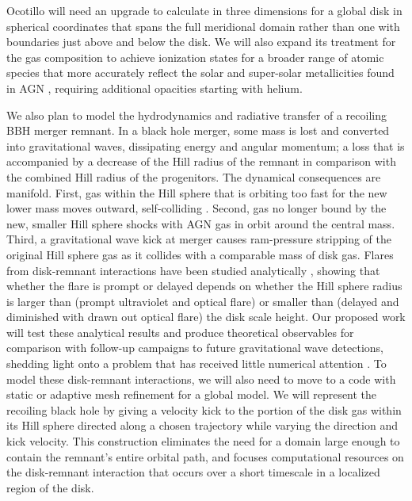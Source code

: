 Ocotillo will need an upgrade to calculate in three dimensions for a global disk in spherical coordinates that spans the full meridional domain rather than one with boundaries just above and below the disk.
We will also expand its treatment for the gas composition to achieve ionization states for a broader range of atomic species that more accurately reflect the solar and super-solar metallicities found in AGN \citep{HuangLinShields23}, requiring additional opacities starting with helium.


We also plan to model the hydrodynamics and radiative transfer of a recoiling BBH merger remnant.
In a black hole merger, some mass is lost and converted into gravitational waves, dissipating energy and angular momentum; a loss that is accompanied by a decrease of the Hill radius of the remnant in comparison with the combined Hill radius of the progenitors.
The dynamical consequences are manifold.
First, gas within the Hill sphere that is orbiting too fast for the new lower mass moves outward, self-colliding \citep{McKernan+19}.
Second, gas no longer bound by the new, smaller Hill sphere shocks with AGN gas in orbit around the central mass.
Third, a gravitational wave kick at merger causes ram-pressure stripping of the original Hill sphere gas as it collides with a comparable mass of disk gas.
Flares from disk-remnant interactions have been studied analytically \citep{McKernan+19}, showing that whether the flare is prompt or delayed depends on whether the Hill sphere radius is larger than (prompt ultraviolet and optical flare) or smaller than (delayed and diminished with drawn out optical flare) the disk scale height.
Our proposed work will test these analytical results and produce theoretical observables for comparison with follow-up campaigns to future gravitational wave detections, shedding light onto a problem that has received little numerical attention \citep{Corrales+10}.
To model these disk-remnant interactions, we will also need to move to a code with static or adaptive mesh refinement for a global model.
We will represent the recoiling black hole by giving a velocity kick to the portion of
the disk gas within its Hill sphere directed along a chosen trajectory while varying the direction and kick velocity.
This construction eliminates the need for a domain large enough to contain the remnant’s
entire orbital path, and focuses computational resources on the disk-remnant interaction that occurs
over a short timescale in a localized region of the disk.

